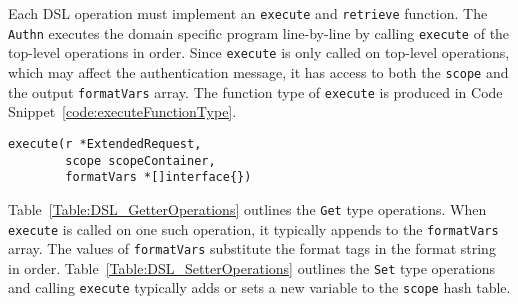 
Each DSL operation must implement an \lstinline{execute} and \lstinline{retrieve} function. The \lstinline{Authn} executes the domain specific program line-by-line by calling \lstinline{execute} of the top-level operations in order. Since \lstinline{execute} is only called on top-level operations, which may affect the authentication message, it has access to both the \lstinline{scope} and the output \lstinline{formatVars} array. The function type of \lstinline{execute} is produced in Code Snippet~\ref{code:executeFunctionType}.




\begin{lstlisting}[float=h,label=code:executeFunctionType,caption=The function type of the \lstinline{execute} function.]
execute(r *ExtendedRequest, 
        scope scopeContainer, 
        formatVars *[]interface{})
\end{lstlisting}

Table~\ref{Table:DSL_GetterOperations} outlines the \lstinline{Get} type operations. When \lstinline{execute} is called on one such operation, it typically appends to the \lstinline{formatVars} array. The values of \lstinline{formatVars} substitute the format tags in the format string in order. Table~\ref{Table:DSL_SetterOperations} outlines the \lstinline{Set} type operations and calling \lstinline{execute} typically adds or sets a new variable to the \lstinline{scope} hash table.


